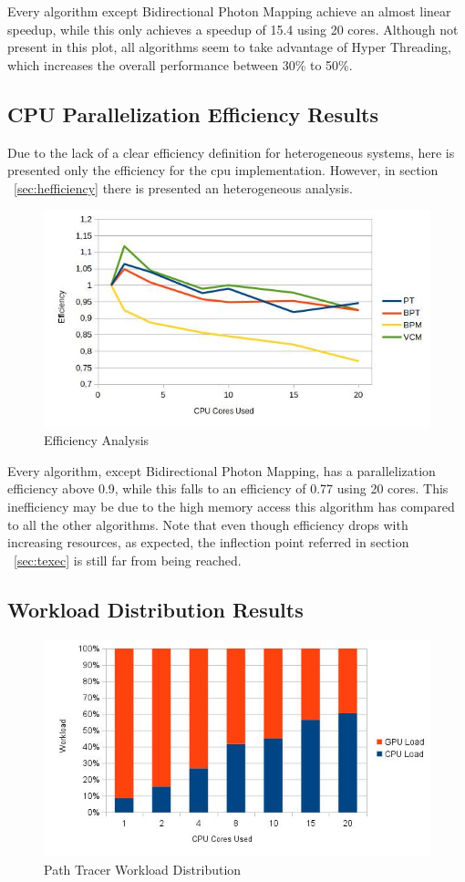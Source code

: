 Every algorithm except Bidirectional Photon Mapping achieve an almost linear speedup, while this only achieves a speedup of 15.4 using 20 cores. Although not present in this plot, all algorithms seem to take advantage of Hyper Threading, which increases the overall performance between 30\% to 50\%.

\subsection{CPU Parallelization Efficiency Results}

Due to the lack of a clear efficiency definition for heterogeneous systems, here is presented only the efficiency for the \gls{cpu} implementation. However, in section ~\ref{sec:hefficiency} there is presented an heterogeneous analysis.

\begin{figure}[H]
\centering
\includegraphics[width=0.8\linewidth]{img/efficiency.jpg}
\caption{\label{img:efficiency} Efficiency Analysis}
\end{figure}

Every algorithm, except Bidirectional Photon Mapping, has a parallelization efficiency above 0.9, while this falls to an efficiency of 0.77 using 20 cores. This inefficiency may be due to the high memory access this algorithm has compared to all the other algorithms. Note that even though efficiency drops with increasing resources, as expected, the inflection point referred in section ~\ref{sec:texec} is still far from being reached.

\subsection{Workload Distribution Results}

\begin{figure}[H]
\centering
\includegraphics[width=0.8\linewidth]{img/ptwl.jpg}
\caption{\label{img:ptwl} Path Tracer Workload Distribution}
\end{figure}

